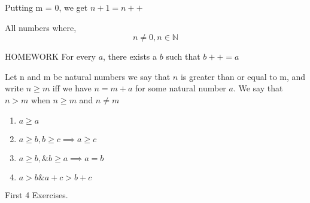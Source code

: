 \documentclass[11pt]{report}
\begin{document}
Putting m = 0, we get \(n+1 = n++\)
\begin{definition}
All numbers where,
\[
n \neq 0, n \in \mathbb{N}
\]
\end{definition}

\begin{lemma}HOMEWORK
For every $a$, there exists a $b$ such that $b++ = a$
\end{lemma}
\begin{definition}[Order]
Let n and m be natural numbers we say that $n$ is greater than or equal to m, and write $n \geq m$ iff we have $n = m + a$ for some natural number $a$. We say that $n > m$ when $n \geq m$ and $n \neq m$
\end{definition}

\begin{enumerate}
\item $a \geq a$
\item $a \geq b, b \geq c \implies a \geq c$
\item $a \geq b, \& b \geq a \implies a = b$
\item $a > b \& a + c > b + c$
\end{enumerate}

First 4 Exercises.
\end{document}
